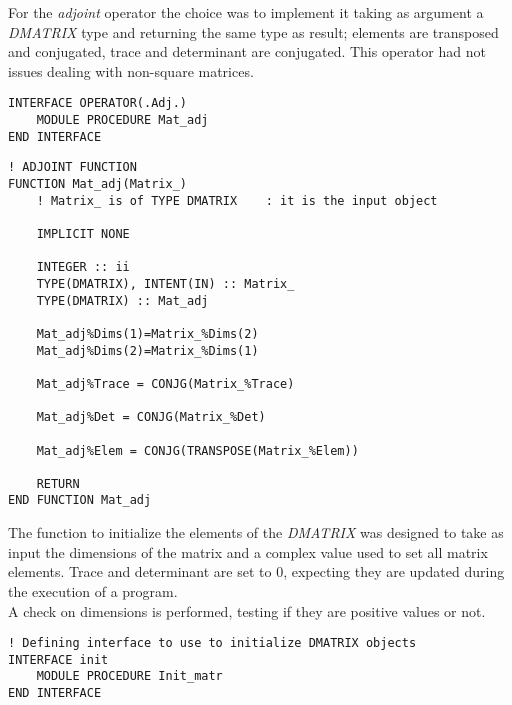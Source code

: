 \documentclass[12pt, a4paper, notitlepage]{report}
\begin{document}
\vspace{0.7cm}

For the \textit{adjoint} operator the choice was to implement it taking as argument a \textit{DMATRIX} type and returning the same type as result; elements are transposed and conjugated, trace and determinant are conjugated. This operator had not issues dealing with non-square matrices.
\begin{lstlisting}
INTERFACE OPERATOR(.Adj.)
	MODULE PROCEDURE Mat_adj
END INTERFACE
\end{lstlisting}

\begin{lstlisting}
! ADJOINT FUNCTION
FUNCTION Mat_adj(Matrix_)
	! Matrix_ is of TYPE DMATRIX	: it is the input object
	
	IMPLICIT NONE
	
	INTEGER :: ii
	TYPE(DMATRIX), INTENT(IN) :: Matrix_
	TYPE(DMATRIX) :: Mat_adj
	
	Mat_adj%Dims(1)=Matrix_%Dims(2)
	Mat_adj%Dims(2)=Matrix_%Dims(1)
	
	Mat_adj%Trace = CONJG(Matrix_%Trace)
	
	Mat_adj%Det = CONJG(Matrix_%Det)
	
	Mat_adj%Elem = CONJG(TRANSPOSE(Matrix_%Elem))
	
	RETURN
END FUNCTION Mat_adj
\end{lstlisting}

\vspace{0.5cm}

The function to initialize the elements of the \textit{DMATRIX} was designed to take as input the dimensions of the matrix and a complex value used to set all matrix elements. Trace and determinant are set to 0, expecting they are updated during the execution of a program.\\
A check on dimensions is performed, testing if they are positive values or not.

\begin{lstlisting}
! Defining interface to use to initialize DMATRIX objects
INTERFACE init
	MODULE PROCEDURE Init_matr
END INTERFACE
\end{lstlisting}
\end{document}
